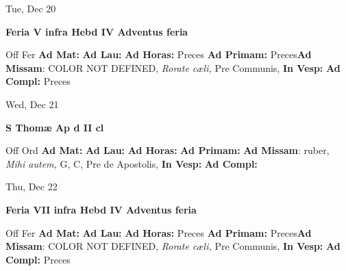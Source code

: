 \documentclass[10pt]{book}
\begin{document}
\begin{center}
\begin{minipage}{3.5in}
\vspace{2em}
\begin{center}Tue, Dec 20
\end{center}
\textbf{ \large Feria V infra Hebd IV Adventus
\textnormal{\normalsize feria}}

\begin{justify}Off Fer
\textbf{Ad Mat: }
\textbf{Ad Lau: }
\textbf{Ad Horas: }Preces
\textbf{Ad Primam: }Preces\textbf{Ad Missam}: COLOR NOT DEFINED, \textit{Rorate cæli,} Pre Communis, 
\textbf{In Vesp: }
\textbf{Ad Compl: }Preces
\end{justify}
\end{minipage}
\end{center}

\begin{center}
\begin{minipage}{3.5in}
\vspace{2em}
\begin{center}Wed, Dec 21
\end{center}
\textbf{ \large S Thomæ Ap
\textnormal{\normalsize d II cl}}

\begin{justify}Off Ord
\textbf{Ad Mat: }
\textbf{Ad Lau: }
\textbf{Ad Horas: }
\textbf{Ad Primam: }\textbf{Ad Missam}: ruber, \textit{Mihi autem,} G, C, Pre de Apostolis, 
\textbf{In Vesp: }
\textbf{Ad Compl: }
\end{justify}
\end{minipage}
\end{center}

\begin{center}
\begin{minipage}{3.5in}
\vspace{2em}
\begin{center}Thu, Dec 22
\end{center}
\textbf{ \large Feria VII infra Hebd IV Adventus
\textnormal{\normalsize feria}}

\begin{justify}Off Fer
\textbf{Ad Mat: }
\textbf{Ad Lau: }
\textbf{Ad Horas: }Preces
\textbf{Ad Primam: }Preces\textbf{Ad Missam}: COLOR NOT DEFINED, \textit{Rorate cæli,} Pre Communis, 
\textbf{In Vesp: }
\textbf{Ad Compl: }Preces
\end{justify}
\end{minipage}
\end{center}
\end{document}
